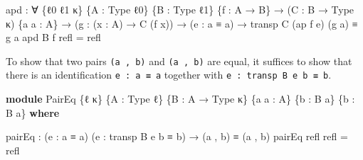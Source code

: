 \documentclass[
  11pt,
  oneside,
  article]{memoir}
\newenvironment{Shaded}{}{}
\newcommand{\KeywordTok}[1]{\textcolor[rgb]{0.00,0.44,0.13}{\textbf{#1}}}
\newcommand{\NormalTok}[1]{#1}
\newcommand{\OtherTok}[1]{\textcolor[rgb]{0.00,0.44,0.13}{#1}}
\theoremstyle{definition}
\theoremstyle{plain}
\newcommand{\0}{\textsf{0}}
\newcommand{\1}{\tn{\textsf{1}}}
\begin{document}
\begin{Shaded}
\begin{Highlighting}[]
\NormalTok{apd }\OtherTok{:} \OtherTok{∀} \OtherTok{\{}\NormalTok{ℓ0 ℓ1 κ}\OtherTok{\}} \OtherTok{\{}\NormalTok{A }\OtherTok{:}\NormalTok{ Type ℓ0}\OtherTok{\}} \OtherTok{\{}\NormalTok{B }\OtherTok{:}\NormalTok{ Type ℓ1}\OtherTok{\}} \OtherTok{\{}\NormalTok{f }\OtherTok{:}\NormalTok{ A }\OtherTok{→}\NormalTok{ B}\OtherTok{\}}
      \OtherTok{→} \OtherTok{(}\NormalTok{C }\OtherTok{:}\NormalTok{ B }\OtherTok{→}\NormalTok{ Type κ}\OtherTok{)} \OtherTok{\{}\NormalTok{a a\textquotesingle{} }\OtherTok{:}\NormalTok{ A}\OtherTok{\}}
      \OtherTok{→} \OtherTok{(}\NormalTok{g }\OtherTok{:} \OtherTok{(}\NormalTok{x }\OtherTok{:}\NormalTok{ A}\OtherTok{)} \OtherTok{→}\NormalTok{ C }\OtherTok{(}\NormalTok{f x}\OtherTok{))} \OtherTok{→} \OtherTok{(}\NormalTok{e }\OtherTok{:}\NormalTok{ a ≡ a\textquotesingle{}}\OtherTok{)} \OtherTok{→}\NormalTok{ transp C }\OtherTok{(}\NormalTok{ap f e}\OtherTok{)} \OtherTok{(}\NormalTok{g a}\OtherTok{)}\NormalTok{ ≡ g a\textquotesingle{}}
\NormalTok{apd B f refl }\OtherTok{=}\NormalTok{ refl}
\end{Highlighting}
\end{Shaded}

To show that two pairs \texttt{(a\ ,\ b)} and
\texttt{(a\textquotesingle{}\ ,\ b\textquotesingle{})} are equal, it
suffices to show that there is an identification
\texttt{e\ :\ a\ ≡\ a\textquotesingle{}} together with
\texttt{e\textquotesingle{}\ :\ transp\ B\ e\ b\ ≡\ b\textquotesingle{}}.

\begin{Shaded}
\begin{Highlighting}[]
\KeywordTok{module}\NormalTok{ PairEq }\OtherTok{\{}\NormalTok{ℓ κ}\OtherTok{\}} \OtherTok{\{}\NormalTok{A }\OtherTok{:}\NormalTok{ Type ℓ}\OtherTok{\}} \OtherTok{\{}\NormalTok{B }\OtherTok{:}\NormalTok{ A }\OtherTok{→}\NormalTok{ Type κ}\OtherTok{\}} 
              \OtherTok{\{}\NormalTok{a a\textquotesingle{} }\OtherTok{:}\NormalTok{ A}\OtherTok{\}} \OtherTok{\{}\NormalTok{b }\OtherTok{:}\NormalTok{ B a}\OtherTok{\}} \OtherTok{\{}\NormalTok{b\textquotesingle{} }\OtherTok{:}\NormalTok{ B a\textquotesingle{}}\OtherTok{\}} \KeywordTok{where}

\NormalTok{    pairEq }\OtherTok{:} \OtherTok{(}\NormalTok{e }\OtherTok{:}\NormalTok{ a ≡ a\textquotesingle{}}\OtherTok{)} \OtherTok{(}\NormalTok{e\textquotesingle{} }\OtherTok{:}\NormalTok{ transp B e b ≡ b\textquotesingle{}}\OtherTok{)} \OtherTok{→} \OtherTok{(}\NormalTok{a , b}\OtherTok{)}\NormalTok{ ≡ }\OtherTok{(}\NormalTok{a\textquotesingle{} , b\textquotesingle{}}\OtherTok{)}
\NormalTok{    pairEq refl refl }\OtherTok{=}\NormalTok{ refl}
\end{Highlighting}
\end{Shaded}
\end{document}
